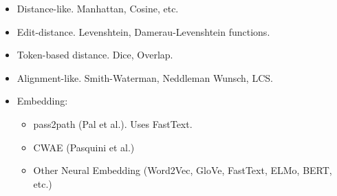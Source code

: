 \begin{itemize}
    \item Distance-like. Manhattan, Cosine, etc.
    \item Edit-distance. Levenshtein, Damerau-Levenshtein functions.
    \item Token-based distance. Dice, Overlap.
    \item Alignment-like. Smith-Waterman, Neddleman Wunsch, LCS.
    \item Embedding:
        \begin{itemize}
            \item pass2path \cite{pal_beyond_2019} (Pal et al.). Uses FastText.
            \item CWAE \cite{pasquini_improving_2021} (Pasquini et al.)
            \item Other Neural Embedding (Word2Vec, GloVe, FastText, ELMo, BERT, etc.)
        \end{itemize}
\end{itemize}


